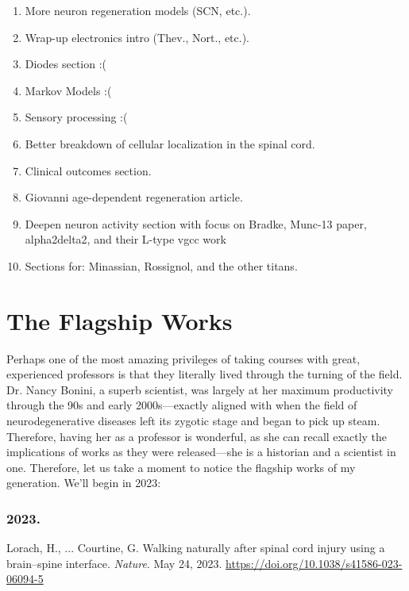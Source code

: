 \footnotesize
\begin{enumerate}
    \item More neuron regeneration models (SCN, etc.).
    \item Wrap-up electronics intro (Thev., Nort., etc.). 
    \item Diodes section :(
    \item Markov Models :(
    \item Sensory processing :(
    \item Better breakdown of cellular localization in the spinal cord. 
    \item Clinical outcomes section. 
    \item Giovanni age-dependent regeneration article.
    \item Deepen neuron activity section with focus on Bradke, Munc-13 paper, alpha2delta2, and their L-type vgcc work
    \item Sections for: Minassian, Rossignol, and the other titans. 
    
\end{enumerate}

\normalsize

\vfill\pagebreak

\section{The Flagship Works}

Perhaps one of the most amazing privileges of taking courses with great, experienced professors is that they literally lived through the turning of the field. Dr. Nancy Bonini, a superb scientist, was largely at her maximum productivity through the 90s and early 2000s---exactly aligned with when the field of neurodegenerative diseases left its zygotic stage and began to pick up steam. Therefore, having her as a professor is wonderful, as she can recall exactly the implications of works as they were released---she is a historian and a scientist in one. Therefore, let us take a moment to notice the flagship works of my generation. We'll begin in 2023: 

\subsubsection{2023.}

Lorach, H., ... Courtine, G. Walking naturally after spinal cord injury using a brain–spine interface. \textit{Nature}. May 24, 2023. \url{https://doi.org/10.1038/s41586-023-06094-5}

